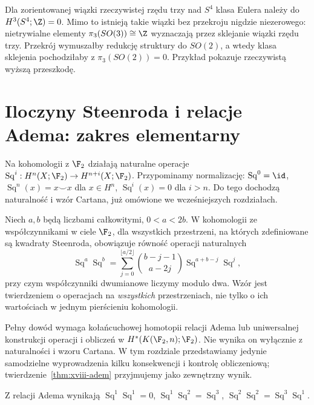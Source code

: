 \begin{przyklad}
Dla zorientowanej wiązki rzeczywistej rzędu trzy nad
$S^4$ klasa Eulera należy do $H^3(S^4;\Z)=0$.
Mimo to istnieją takie wiązki bez przekroju nigdzie
niezerowego: nietrywialne elementy
$\pi_3(SO(3))\cong\Z$ wyznaczają przez sklejanie
wiązki rzędu trzy. Przekrój wymuszałby redukcję
struktury do $SO(2)$, a wtedy klasa sklejenia pochodziłaby
z $\pi_3(SO(2))=0$.
Przykład pokazuje rzeczywistą wyższą przeszkodę.
\end{przyklad}

\section{Iloczyny Steenroda i relacje Adema: zakres elementarny}
Na kohomologii z $\F_2$ działają naturalne operacje
$\operatorname{Sq}^i:H^n(X;\F_2)\to H^{n+i}(X;\F_2)$.
Przypominamy normalizację:
$\operatorname{Sq}^0=\id$,
$\operatorname{Sq}^n(x)=x\smile x$ dla $x\in H^n$,
$\operatorname{Sq}^i(x)=0$ dla $i>n$.
Do tego dochodzą naturalność i wzór Cartana, już omówione
we wcześniejszych rozdziałach.
\begin{twierdzenie}[Relacje Adema, $p=2$]
\label{thm:xviii-adem}
Niech $a,b$ będą liczbami całkowitymi,
$0<a<2b$. W kohomologii ze współczynnikami
w ciele $\F_2$, dla wszystkich przestrzeni,
na których zdefiniowane są kwadraty Steenroda,
obowiązuje równość operacji naturalnych
\[
\operatorname{Sq}^a\operatorname{Sq}^b=
\sum_{j=0}^{\lfloor a/2\rfloor}
\binom{b-j-1}{a-2j}
\operatorname{Sq}^{a+b-j}\operatorname{Sq}^{j},
\]
przy czym współczynniki dwumianowe liczymy modulo dwa.
Wzór jest twierdzeniem o operacjach na \emph{wszystkich}
przestrzeniach, nie tylko o ich wartościach w jednym pierścieniu
kohomologii.
\end{twierdzenie}
\begin{uwaga}
Pełny dowód wymaga kołańcuchowej homotopii relacji Adema
lub uniwersalnej konstrukcji operacji i obliczeń w
$H^*(K(\F_2,n);\F_2)$. Nie wynika on wyłącznie z
naturalności i wzoru Cartana. W tym rozdziale przedstawiamy
jedynie samodzielne wyprowadzenia kilku konsekwencji i
kontrolę obliczeniową; twierdzenie~\ref{thm:xviii-adem}
przyjmujemy jako zewnętrzny wynik.
\end{uwaga}
\begin{stwierdzenie}
Z relacji Adema wynikają
$\operatorname{Sq}^1\operatorname{Sq}^1=0$,
$\operatorname{Sq}^1\operatorname{Sq}^2=\operatorname{Sq}^3$,
$\operatorname{Sq}^2\operatorname{Sq}^2=
\operatorname{Sq}^3\operatorname{Sq}^1$.
\end{stwierdzenie}
